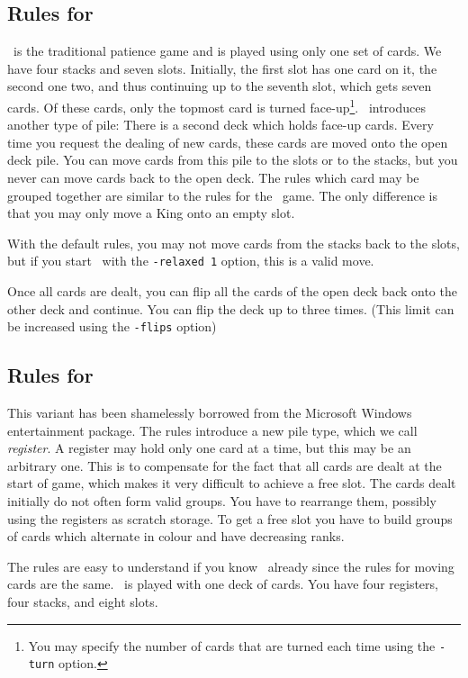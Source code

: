 \subsection{Rules for \klondike}
\klondike\ is the traditional patience game and is played using only one set of
cards. We have four stacks and seven slots. Initially, the first slot has one
card on it, the second one two, and thus continuing up to the seventh slot,
which gets seven cards.  Of these cards, only the topmost card is turned
face-up\footnote{You may specify the number of cards that are turned each time
using the {\tt -turn} option.}.
\klondike\ introduces another type of pile: There is a second deck 
which holds face-up cards. Every time you request the dealing of new cards,
these cards are moved onto the open deck pile.
You can move cards from this pile to the
slots or to the stacks, but you never can move cards back to the open deck.
The rules which card may be grouped together are similar to the rules for the
\gypsy\ game. The only difference is that you may only move a King onto an
empty slot.

With the default rules, you may not move cards from the stacks back to the
slots, but if you start \xpat\ with the {\tt -relaxed 1} option, this is a
valid move.

Once all cards are dealt, you can flip all the cards of the open deck back
onto the other deck and continue. You can flip the deck up to three times.
(This limit can be increased using the {\tt -flips} option)

\subsection{Rules for \freecell}
This variant has been shamelessly borrowed from the Microsoft Windows
entertainment package. The rules introduce a new pile type, which we call {\em
  register\/}. A register may hold only one card at a time, but this may be an
arbitrary one. This is to compensate for the fact that all cards are dealt at
the start of game, which makes it very difficult to achieve a free slot.
The cards dealt initially do not often form valid groups. You have to rearrange
them, possibly using the registers as scratch storage.  To get a free slot you
have to build groups of cards which alternate in colour and have decreasing
ranks.

The rules are easy to understand if you know \gypsy\ already
since the rules for moving cards are the same.  \freecell\ is played with one
deck of cards. You have four registers, four stacks, and eight slots.

